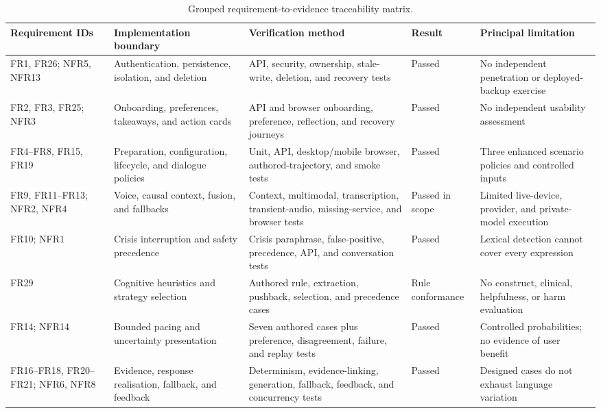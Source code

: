\begin{table}[p]
\centering
\caption{Grouped requirement-to-evidence traceability matrix.}
\label{tab:requirements-traceability}
\scriptsize
\setlength{\tabcolsep}{3pt}
\renewcommand{\arraystretch}{0.96}
\begin{tabularx}{\textwidth}{|>{\raggedright\arraybackslash}p{}|>{\raggedright\arraybackslash}p{}|>{\raggedright\arraybackslash}p{}|>{\raggedright\arraybackslash}p{}|X|}
\hline
\textbf{Requirement IDs} & \textbf{Implementation boundary} & \textbf{Verification method} & \textbf{Result} & \textbf{Principal limitation} \\ \hline
FR1, FR26; NFR5, NFR13 & Authentication, persistence, isolation, and deletion & API, security, ownership, stale-write, deletion, and recovery tests & Passed & No independent penetration or deployed-backup exercise \\ \hline
FR2, FR3, FR25; NFR3 & Onboarding, preferences, takeaways, and action cards & API and browser onboarding, preference, reflection, and recovery journeys & Passed & No independent usability assessment \\ \hline
FR4--FR8, FR15, FR19 & Preparation, configuration, lifecycle, and dialogue policies & Unit, API, desktop/mobile browser, authored-trajectory, and smoke tests & Passed & Three enhanced scenario policies and controlled inputs \\ \hline
FR9, FR11--FR13; NFR2, NFR4 & Voice, causal context, fusion, and fallbacks & Context, multimodal, transcription, transient-audio, missing-service, and browser tests & Passed in scope & Limited live-device, provider, and private-model execution \\ \hline
FR10; NFR1 & Crisis interruption and safety precedence & Crisis paraphrase, false-positive, precedence, API, and conversation tests & Passed & Lexical detection cannot cover every expression \\ \hline
FR29 & Cognitive heuristics and strategy selection & Authored rule, extraction, pushback, selection, and precedence cases & Rule conformance & No construct, clinical, helpfulness, or harm evaluation \\ \hline
FR14; NFR14 & Bounded pacing and uncertainty presentation & Seven authored cases plus preference, disagreement, failure, and replay tests & Passed & Controlled probabilities; no evidence of user benefit \\ \hline
FR16--FR18, FR20--FR21; NFR6, NFR8 & Evidence, response realisation, fallback, and feedback & Determinism, evidence-linking, generation, fallback, feedback, and concurrency tests & Passed & Designed cases do not exhaust language variation \\ \hline

\end{tabularx}
\end{table}
